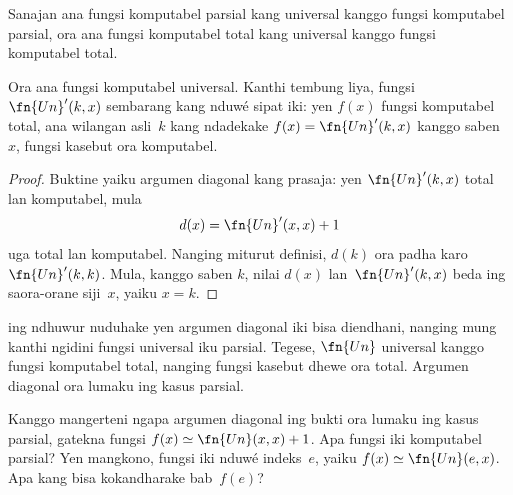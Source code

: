 \documentclass[../../../include/open-logic-section]{subfiles}
\begin{document}

%
Sanajan ana fungsi komputabel parsial kang
universal kanggo fungsi komputabel parsial,
ora ana fungsi komputabel total kang universal
kanggo fungsi komputabel total.

\begin{thm}
Ora ana fungsi komputabel universal. Kanthi
tembung liya, fungsi $\fn{Un}'(k, x)$ sembarang
kang nduwé sipat iki: yen $f(x)$ fungsi komputabel
total, ana wilangan asli~$k$ kang ndadekake
$f(x) = \fn{Un}'(k,x)$ kanggo saben~$x$,
fungsi kasebut ora komputabel.
\end{thm}

\begin{proof}
Buktine yaiku argumen diagonal kang prasaja:
yen $\fn{Un}'(k,x)$ total lan komputabel,
mula
\[
d(x) = \fn{Un}'(x, x) + 1
\]
uga total lan komputabel. Nanging miturut
definisi, $d(k)$ ora padha karo
$\fn{Un}'(k,k)$. Mula, kanggo saben $k$,
nilai $d(x)$ lan~$\fn{Un}'(k, x)$ beda
ing saora-orane siji~$x$, yaiku $x = k$.
\end{proof}

\begin{explain}
 ing ndhuwur nuduhake
yen argumen diagonal iki bisa diendhani,
nanging mung kanthi ngidini fungsi universal
iku parsial. Tegese, $\fn{Un}$ universal
kanggo fungsi komputabel total, nanging
fungsi kasebut dhewe ora total. Argumen
diagonal ora lumaku ing kasus parsial.
\end{explain}

\begin{prob}
  Kanggo mangerteni ngapa argumen diagonal
  ing bukti  ora lumaku
  ing kasus parsial, gatekna fungsi
  $f(x) \simeq \fn{Un}(x,x)+1$. Apa fungsi
  iki komputabel parsial? Yen mangkono,
  fungsi iki nduwé indeks~$e$, yaiku
  $f(x) \simeq \fn{Un}(e,x)$. Apa kang
  bisa kokandharake bab~$f(e)$?
\end{prob}
\end{document}
